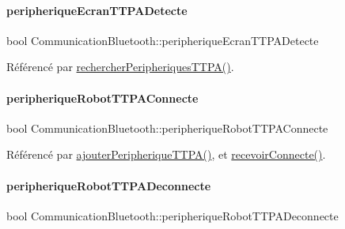 \paragraph{\texorpdfstring{peripherique\+Ecran\+T\+T\+P\+A\+Detecte}{peripheriqueEcranTTPADetecte}}
{\footnotesize\ttfamily bool Communication\+Bluetooth\+::peripherique\+Ecran\+T\+T\+P\+A\+Detecte}



Référencé par \hyperlink{class_communication_bluetooth_a4c2e2d557728c227faeb247cb8a9c482}{rechercher\+Peripheriques\+T\+T\+P\+A()}.

\mbox{\label{class_communication_bluetooth_a451b47553dd5cf716e8825c0fc0c203b}} 
\paragraph{\texorpdfstring{peripherique\+Robot\+T\+T\+P\+A\+Connecte}{peripheriqueRobotTTPAConnecte}}
{\footnotesize\ttfamily bool Communication\+Bluetooth\+::peripherique\+Robot\+T\+T\+P\+A\+Connecte}



Référencé par \hyperlink{class_communication_bluetooth_a53bc4772892ec57f030600e49fa0b6ff}{ajouter\+Peripherique\+T\+T\+P\+A()}, et \hyperlink{class_communication_bluetooth_aee7edc20fc1fdfd5a5a1c228c1319531}{recevoir\+Connecte()}.

\mbox{\label{class_communication_bluetooth_aaebda45ba1821d9b15ed957926954ddc}} 
\paragraph{\texorpdfstring{peripherique\+Robot\+T\+T\+P\+A\+Deconnecte}{peripheriqueRobotTTPADeconnecte}}
{\footnotesize\ttfamily bool Communication\+Bluetooth\+::peripherique\+Robot\+T\+T\+P\+A\+Deconnecte}



